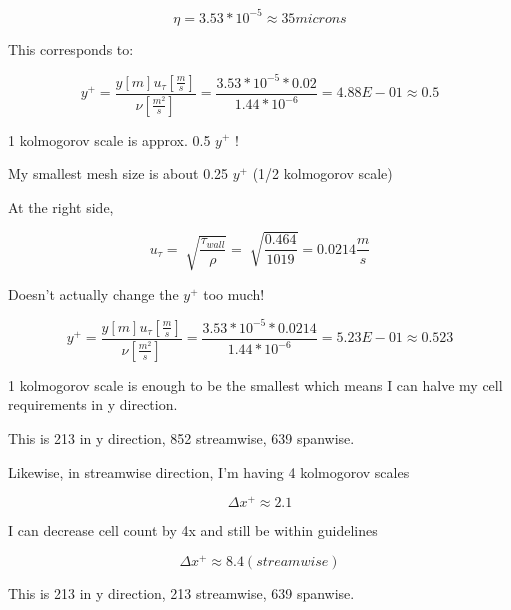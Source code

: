 \documentclass[12pt]{article}
\renewcommand{\_}{\kern-1.5pt\textunderscore\kern-1.5pt}
\begin{document}
 \[  \eta =3.53\ast10^{-5} \approx 35 microns \] \par

This corresponds to:\par

 \[ y^{+}=\frac{y \left[ m \right] u_{ \tau} \left[ \frac{m}{s} \right] }{ \nu  \left[ \frac{m^{2}}{s} \right] }=\frac{3.53\ast10^{-5}\ast0.02}{1.44\ast10^{-6}}=4.88E-01 \approx 0.5  \] \par

1 kolmogorov scale is approx. 0.5  \( y^{+} \) !\par

My smallest mesh size is about 0.25  \( y^{+} \)  (1/2 kolmogorov scale)\par

At the right side,\par

 \[ u_{ \tau}=\sqrt[]{\frac{ \tau_{wall}}{ \rho }}=\sqrt[]{\frac{0.464}{1019}}=0.0214\frac{m}{s} \] \par

Doesn’t actually change the  \( y^{+} \)  too much!\par

 \[ y^{+}=\frac{y \left[ m \right] u_{ \tau} \left[ \frac{m}{s} \right] }{ \nu  \left[ \frac{m^{2}}{s} \right] }=\frac{3.53\ast10^{-5}\ast0.0214}{1.44\ast10^{-6}}=5.23E-01 \approx 0.523 \] \par

1 kolmogorov scale is enough to be the smallest which means I can halve my cell requirements in y direction.\par


\vspace{\baselineskip}
This is 213 in y direction, 852 streamwise, 639 spanwise.\par

Likewise, in streamwise direction, I’m having 4 kolmogorov scales\par

 \[  \Delta x^{+} \approx 2.1 \] \par

I can decrease cell count by 4x and still be within guidelines\par

 \[  \Delta x^{+} \approx 8.4  \left( streamwise \right)  \] \par


\vspace{\baselineskip}
 This is 213 in y direction, 213 streamwise, 639 spanwise.\par
\end{document}
